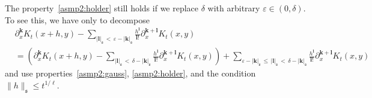 \documentclass[AHL,Unicode,longabstracts,published]{cedram}
\newcommand{\mfs}{\mathfrak{s}}
\newcommand{\bfk}{\mathbf{k}}
\newcommand{\bfl}{\mathbf{l}}
\begin{document}
\begin{rema}\label{asmp2'}
The property~\eqref{asmp2:holder} still holds if we replace $\delta$ with arbitrary $\varepsilon\in(0,\delta)$. To see this, we have only to decompose
\begin{align*}
&\partial_x^{\bfk}K_t(x+h,y)-\sum_{|{\bfl}|_\mfs\,<\,\varepsilon-|{\bfk}|_\mfs}\frac{h^{\bfl}}{{\bfl}!}\partial_x^{{\bfk}+{\bfl}}K_t(x,y)\\
&=\left(\partial_x^{\bfk}K_t(x+h,y)-\sum_{|{\bfl}|_\mfs\,<\,\delta-|{\bfk}|_\mfs}\frac{h^{\bfl}}{{\bfl}!}\partial_x^{{\bfk}+{\bfl}}K_t(x,y)\right)+\sum_{\varepsilon-|{\bfk}|_{\mfs}\,\le\,|{\bfl}|_{\mfs}\,<\,\delta-|{\bfk}|_{\mfs}}\frac{h^{\bfl}}{{\bfl}!}\partial_x^{{\bfk}+{\bfl}}K_t(x,y)
\end{align*}
and use properties~\eqref{asmp2:gauss}, \eqref{asmp2:holder}, and the condition $\|h\|_{\mfs}\le t^{1/\ell}$.
\end{rema}
\end{document}
